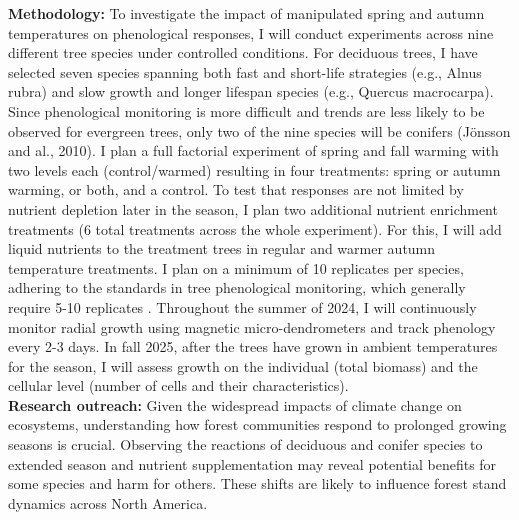 \documentclass{article}
\begin{document}
\textbf {Methodology:} To investigate the impact of manipulated spring and autumn temperatures on phenological responses, I will conduct experiments across nine different tree species under controlled conditions. For deciduous trees, I have selected seven species spanning both fast and short-life strategies (e.g., Alnus rubra) and slow growth and longer lifespan species (e.g., Quercus macrocarpa). Since phenological monitoring is more difficult and trends are less likely to be observed for evergreen trees, only two of the nine species will be conifers (Jönsson and al., 2010). I plan a full factorial experiment of spring and fall warming with two levels each (control/warmed) resulting in four treatments: spring or autumn warming, or both, and a control. To test that responses are not limited by nutrient depletion later in the season, I plan two additional nutrient enrichment treatments (6 total treatments across the whole experiment). For this, I will add liquid nutrients to the treatment trees in regular and warmer autumn temperature treatments. I plan on a minimum of 10 replicates per species, adhering to the standards in tree phenological monitoring, which generally require 5-10 replicates \citep{siegel_collaborative_2009}.
Throughout the summer of 2024, I will continuously monitor radial growth using magnetic micro-dendrometers and track phenology every 2-3 days. In fall 2025, after the trees have grown in ambient temperatures for the season, I will assess growth on the individual (total biomass) and the cellular level (number of cells and their characteristics). \\
\textbf{Research outreach:} Given the widespread impacts of climate change on ecosystems, understanding how forest communities respond to prolonged growing seasons is crucial. Observing the reactions of deciduous and conifer species to extended season and nutrient supplementation may reveal potential benefits for some species and harm for others. These shifts are likely to influence forest stand dynamics across North America.


\end{document}
